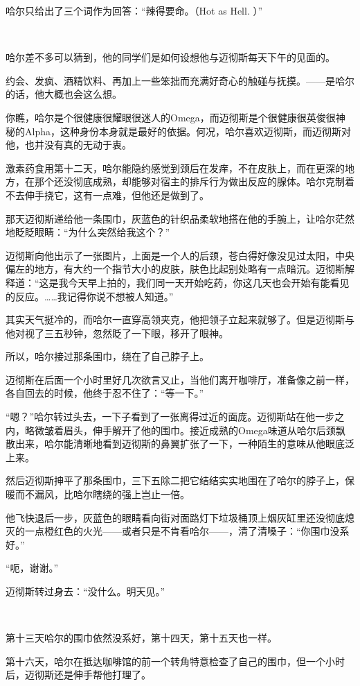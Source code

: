 \documentclass[../main]{subfiles}
\begin{document}
哈尔只给出了三个词作为回答：“辣得要命。（Hot as Hell. ）”

~\

哈尔差不多可以猜到，他的同学们是如何设想他与迈彻斯每天下午的见面的。

约会、发疯、酒精饮料、再加上一些笨拙而充满好奇心的触碰与抚摸。——是哈尔的话，他大概也会这么想。

你瞧，哈尔是个很健康很耀眼很迷人的Omega，而迈彻斯是个很健康很英俊很神秘的Alpha，这种身份本身就是最好的依据。何况，哈尔喜欢迈彻斯，而迈彻斯对他，也并没有真的无动于衷。

激素药食用第十二天，哈尔能隐约感觉到颈后在发痒，不在皮肤上，而在更深的地方，在那个还没彻底成熟，却能够对宿主的排斥行为做出反应的腺体。哈尔克制着不去伸手挠它，这有一点难，但他还是做到了。

那天迈彻斯递给他一条围巾，灰蓝色的针织品柔软地搭在他的手腕上，让哈尔茫然地眨眨眼睛：“为什么突然给我这个？”

迈彻斯向他出示了一张图片，上面是一个人的后颈，苍白得好像没见过太阳，中央偏左的地方，有大约一个指节大小的皮肤，肤色比起别处略有一点暗沉。迈彻斯解释道：“这是我今天早上拍的，我们同一天开始吃药，你这几天也会开始有能看见的反应。……我记得你说不想被人知道。”

其实天气挺冷的，而哈尔一直穿高领夹克，他把领子立起来就够了。但是迈彻斯与他对视了三五秒钟，忽然眨了一下眼，移开了眼神。

所以，哈尔接过那条围巾，绕在了自己脖子上。

迈彻斯在后面一个小时里好几次欲言又止，当他们离开咖啡厅，准备像之前一样，各自回去的时候，他终于忍不住了：“等一下。”

“嗯？”哈尔转过头去，一下子看到了一张离得过近的面庞。迈彻斯站在他一步之内，略微皱着眉头，伸手解开了他的围巾。接近成熟的Omega味道从哈尔后颈飘散出来，哈尔能清晰地看到迈彻斯的鼻翼扩张了一下，一种陌生的意味从他眼底泛上来。

然后迈彻斯抻平了那条围巾，三下五除二把它结结实实地围在了哈尔的脖子上，保暖而不漏风，比哈尔瞎绕的强上岂止一倍。

他飞快退后一步，灰蓝色的眼睛看向街对面路灯下垃圾桶顶上烟灰缸里还没彻底熄灭的一点橙红色的火光——或者只是不肯看哈尔——，清了清嗓子：“你围巾没系好。”

“呃，谢谢。”

迈彻斯转过身去：“没什么。明天见。”

~\

第十三天哈尔的围巾依然没系好，第十四天，第十五天也一样。

第十六天，哈尔在抵达咖啡馆的前一个转角特意检查了自己的围巾，但一个小时后，迈彻斯还是伸手帮他打理了。
\end{document}
